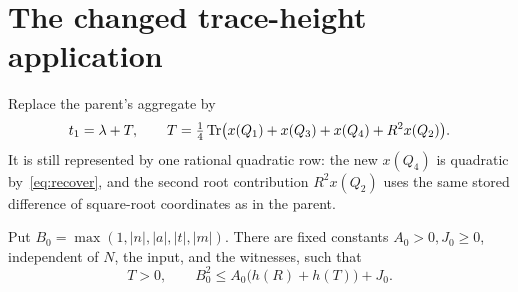\documentclass[11pt,a4paper]{article}
\begin{document}
\section{The changed trace-height application}\label{sec:weighted}
Replace the parent's aggregate by
\begin{equation}\label{eq:aggregate}
 t_1=\lambda+T,\qquad
 T=\tfrac14\operatorname{Tr}\bigl(x(Q_1)+x(Q_3)+x(Q_4)+R^2x(Q_2)\bigr).
\end{equation}
It is still represented by one rational quadratic row: the new $x(Q_4)$
is quadratic by~\eqref{eq:recover}, and the second root contribution
$R^2x(Q_2)$ uses the same stored difference of square-root coordinates
as in the parent.

\begin{lemma}\label{lem:height}
Put $B_0=\max(1,|n|,|a|,|t|,|m|)$. There are fixed constants
$A_0>0,J_0\ge0$, independent of $N$, the input, and the witnesses, such that
\[
 T>0,\qquad B_0^2\le A_0\bigl(h(R)+h(T)\bigr)+J_0.
\]
\end{lemma}
\end{document}
